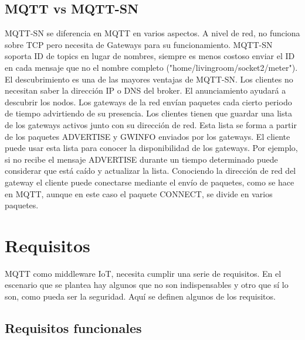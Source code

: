\documentclass[12pt, twoside]{book}
\begin{document}
\subsection{MQTT vs MQTT-SN}
MQTT-SN se diferencia en MQTT en varios aspectos. A nivel de red, no funciona sobre TCP pero necesita de Gateways para su funcionamiento.
MQTT-SN soporta ID de topics en lugar de nombres, siempre es menos costoso enviar el ID en cada mensaje que no el nombre completo ("home/livingroom/socket2/meter"). \\
El descubrimiento es una de las mayores ventajas de MQTT-SN. Los clientes no necesitan saber la dirección IP o DNS del broker. El anunciamiento ayudará a descubrir los nodos. Los gateways de la red envían paquetes cada cierto periodo de tiempo advirtiendo de su presencia. Los clientes tienen que guardar una lista de los gateways activos junto con su dirección de red. Esta lista se forma a partir de los paquetes ADVERTISE y GWINFO enviados por los gateways. El cliente puede usar esta lista para conocer la disponibilidad de los gateways. Por ejemplo, si no recibe el mensaje ADVERTISE durante un tiempo determinado puede considerar que está caído y actualizar la lista. Conociendo la dirección de red del gateway el cliente puede conectarse mediante el envío de paquetes, como se hace en MQTT, aunque en este caso el paquete CONNECT, se divide en varios paquetes.\\
\section{Requisitos}
MQTT como middleware IoT, necesita cumplir una serie de requisitos. En el escenario que se plantea hay algunos que no son indispensables y otro que sí lo son, como pueda ser la seguridad. Aquí se definen algunos de los requisitos.
\subsection{Requisitos funcionales}
\end{document}
